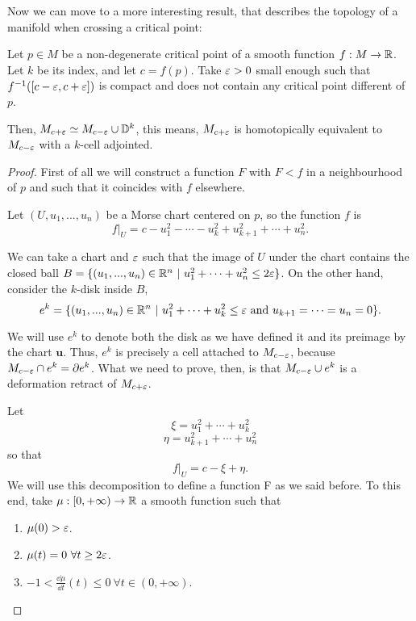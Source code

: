 Now we can move to a more interesting result, that describes the topology of a manifold when crossing a critical point:

\begin{theo}
Let $p \in M$ be a non-degenerate critical point of a smooth function $f : M \rightarrow \mathbb{R}$. Let $k$ be its index, and let $c = f(p)$. Take $\varepsilon > 0$ small enough such that $f^{-1}([c-\varepsilon,c+\varepsilon])$ is compact and does not contain any critical point different of $p$.

Then, $M_{c+\varepsilon} \simeq M_{c-\varepsilon} \cup \mathbb{D}^k$, this means, $M_{c+\varepsilon}$ is homotopically equivalent to $M_{c-\varepsilon}$ with a $k$-cell adjointed.
\end{theo}

\begin{proof}
First of all we will construct a function $F$ with $F < f$ in a neighbourhood of $p$ and such that it coincides with $f$ elsewhere.

Let $(U,u_1,...,u_n)$ be a Morse chart centered on $p$, so the function $f$ is
$$\left. f \right|_U = c - u_1^2 - \cdots - u_k^2 + u_{k+1}^2 + \cdots + u_n^2 .$$

We can take a chart and $\varepsilon$ such that the image of $U$ under the chart contains the closed ball $B = \{(u_1,...,u_n) \in \mathbb{R}^n \ | \ u_1^2 + \cdots + u_n^2 \leq 2\varepsilon\}$. On the other hand, consider the $k$-disk inside $B$,
$$e^k = \{ (u_1,...,u_n) \in \mathbb{R}^n \ | \ u_1^2 + \cdots + u_k^2 \leq \varepsilon \text{ and } u_{k+1} = \cdots = u_n = 0 \} .$$

We will use $e^k$ to denote both the disk as we have defined it and its preimage by the chart $\mathbf{u}$. Thus, $e^k$ is precisely a cell attached to $M_{c-\varepsilon}$, because $M_{c-\varepsilon} \cap e^k = \partial e^k$. What we need to prove, then, is that $M_{c-\varepsilon} \cup e^k$ is a deformation retract of $M_{c+\varepsilon}$.

Let
$$\xi = u_1^2 + \cdots + u_k^2$$
$$\eta = u_{k+1}^2 + \cdots + u_n^2$$
so that
$$\left. f \right|_U = c - \xi + \eta .$$
We will use this decomposition to define a function F as we said before. To this end, take $\mu : [0,+\infty) \rightarrow \mathbb{R}$ a smooth function such that

\begin{enumerate}
	\item $\mu(0) > \varepsilon$.
	\item $\mu(t) = 0 \ \forall t \geq 2\varepsilon$.
	\item $-1 < \frac{\dd \mu}{\dd t}(t) \leq 0 \ \forall t \in (0,+\infty)$.
\end{enumerate}


\end{proof}
